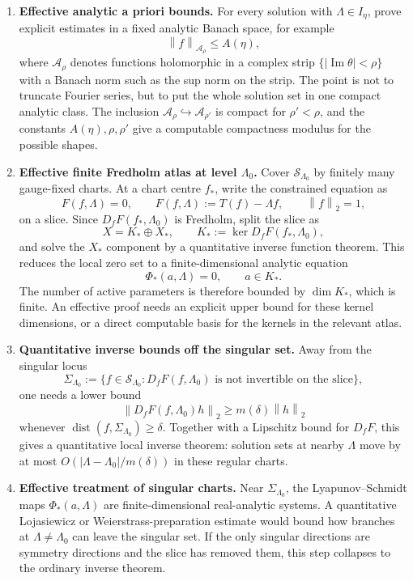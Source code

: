 \documentclass[12pt]{article}
\theoremstyle{definition}
\theoremstyle{remark}
\newcommand{\abs}[1]{\left|#1\right|}
\newcommand{\norm}[1]{\left\|#1\right\|}
\begin{document}
\begin{enumerate}[leftmargin=2em]
  \item \textbf{Effective analytic a priori bounds.}  For every solution
  with $\Lambda\in I_\eta$, prove explicit estimates in a fixed analytic
  Banach space, for example
  \[
    \norm{f}_{\mathcal A_\rho}\leq A(\eta),
  \]
  where $\mathcal A_\rho$ denotes functions holomorphic in a complex
  strip $\{|\operatorname{Im}\theta|<\rho\}$ with a Banach norm such as
  the sup norm on the strip.  The point is not to truncate Fourier
  series, but to put the whole solution set in one compact analytic
  class.  The inclusion $\mathcal A_\rho\hookrightarrow \mathcal A_{\rho'}$
  is compact for $\rho'<\rho$, and the constants $A(\eta),\rho,\rho'$
  give a computable compactness modulus for the possible shapes.

  \item \textbf{Effective finite Fredholm atlas at level $\Lambda_0$.}
  Cover $\mathcal S_{\Lambda_0}$ by finitely many gauge-fixed charts.
  At a chart centre $f_*$, write the constrained equation as
  \[
    F(f,\Lambda)=0,
    \qquad
    F(f,\Lambda):=T(f)-\Lambda f,
    \qquad \norm f_2=1,
  \]
  on a slice.  Since $D_fF(f_*,\Lambda_0)$ is Fredholm, split the slice as
  \[
    X=K_*\oplus X_*,\qquad
    K_*:=\ker D_fF(f_*,\Lambda_0),
  \]
  and solve the $X_*$ component by a quantitative inverse function
  theorem.  This reduces the local zero set to a finite-dimensional
  analytic equation
  \[
    \Phi_*(a,\Lambda)=0,
    \qquad a\in K_*.
  \]
  The number of active parameters is therefore bounded by
  $\dim K_*$, which is finite.  An effective proof needs an explicit upper
  bound for these kernel dimensions, or a direct computable basis for the
  kernels in the relevant atlas.

  \item \textbf{Quantitative inverse bounds off the singular set.}  Away
  from the singular locus
  \[
    \Sigma_{\Lambda_0}:=
    \{f\in\mathcal S_{\Lambda_0}:D_fF(f,\Lambda_0)
      \text{ is not invertible on the slice}\},
  \]
  one needs a lower bound
  \begin{equation}\label{eq:away-singular-inverse}
    \norm{D_fF(f,\Lambda_0)h}_2
    \geq m(\delta)\norm h_2
  \end{equation}
  whenever $\operatorname{dist}(f,\Sigma_{\Lambda_0})\geq\delta$.
  Together with a Lipschitz bound for $D_fF$, this gives a quantitative
  local inverse theorem: solution sets at nearby $\Lambda$ move by at most
  $O(\abs{\Lambda-\Lambda_0}/m(\delta))$ in these regular charts.

  \item \textbf{Effective treatment of singular charts.}  Near
  $\Sigma_{\Lambda_0}$, the Lyapunov--Schmidt maps
  $\Phi_*(a,\Lambda)$ are finite-dimensional real-analytic systems.  A
  quantitative Lojasiewicz or Weierstrass-preparation estimate would bound
  how branches at $\Lambda\neq\Lambda_0$ can leave the singular set.  If
  the only singular directions are symmetry directions and the slice has
  removed them, this step collapses to the ordinary inverse theorem.
\end{enumerate}
\end{document}
